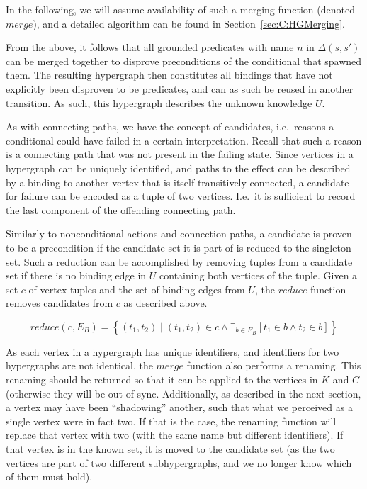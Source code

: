 \documentclass[../Master.tex]{subfiles}
\begin{document}
In the following, we will assume availability of such a merging function (denoted $merge$), and a detailed algorithm can be found in Section~\ref{sec:C:HGMerging}.

From the above, it follows that all grounded predicates with name $n$ in $\Delta\left(s, s'\right)$ can be merged together to disprove preconditions of the conditional that spawned them. The resulting hypergraph then constitutes all bindings that have not explicitly been disproven to be predicates, and can as such be reused in another transition. As such, this hypergraph describes the unknown knowledge $U$.

As with connecting paths, we have the concept of candidates, i.e.\ reasons a conditional could have failed in a certain interpretation. Recall that such a reason is a connecting path that was not present in the failing state. Since vertices in a hypergraph can be uniquely identified, and paths to the effect can be described by a binding to another vertex that is itself transitively connected, a candidate for failure can be encoded as a tuple of two vertices. I.e.\ it is sufficient to record the last component of the offending connecting path.

Similarly to nonconditional actions and connection paths, a candidate is proven to be a precondition if the candidate set it is part of is reduced to the singleton set. Such a reduction can be accomplished by removing tuples from a candidate set if there is no binding edge in $U$ containing both vertices of the tuple. Given a set $c$ of vertex tuples and the set of binding edges from $U$, the $reduce$ function removes candidates from $c$ as described above.

\begin{equation*}
    reduce(c, E_B) =
    \left\{ \left( t_1, t_2 \right) \mid 
        \left( t_1, t_2 \right) \in c \land 
        \exists_{b \in E_B} \left[ t_1 \in b \land t_2 \in b \right] 
    \right\}
\end{equation*}

As each vertex in a hypergraph has unique identifiers, and identifiers for two hypergraphs are not identical, the $merge$ function also performs a renaming. This renaming should be returned so that it can be applied to the vertices in $K$ and $C$ (otherwise they will be out of sync. Additionally, as described in the next section, a vertex may have been ``shadowing'' another, such that what we perceived as a single vertex were in fact two. If that is the case, the renaming function will replace that vertex with two (with the same name but different identifiers). If that vertex is in the known set, it is moved to the candidate set (as the two vertices are part of two different subhypergraphs, and we no longer know which of them must hold).
\end{document}
